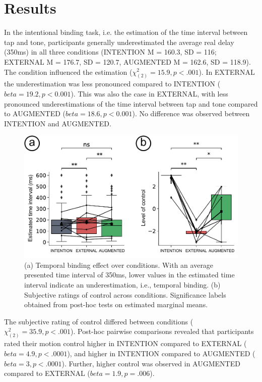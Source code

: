 \section{Results}
In the intentional binding task, i.e. the estimation of the time interval between tap and tone, participants generally underestimated the average real delay (350ms) in all three conditions (INTENTION M = 160.3, SD = 116; EXTERNAL M = 176.7, SD = 120.7, AUGMENTED M = 162.6, SD = 118.9). The condition influenced the estimation (${\chi^{2}_{(2)}} = 15.9, p < .001$). In EXTERNAL the underestimation was less pronounced compared to INTENTION ($beta = 19.2, p < 0.001$). This was also the case in EXTERNAL, with less pronounced underestimations of the time interval between tap and tone compared to AUGMENTED ($beta = 18.6, p < 0.001$). No difference was observed between INTENTION and AUGMENTED.

\begin{figure}
    \centering
    \includegraphics[width=\columnwidth]{figures/behavioral_results.pdf}
    \caption{(a) Temporal binding effect over conditions. With an average presented time interval of 350ms, lower values in the estimated time interval indicate an underestimation, i.e., temporal binding. (b) Subjective ratings of control across conditions. Significance labels obtained from post-hoc tests on estimated marginal means.}
    \label{fig:results}
\end{figure}

The subjective rating of control differed between conditions (${\chi^{2}_{(2)}} = 35.9, p < .001$). Post-hoc pairwise comparisons revealed that participants rated their motion control higher in INTENTION compared to EXTERNAL ($beta = 4.9, p < .0001$), and higher in INTENTION compared to AUGMENTED ($beta = 3, p < .0001$). Further, higher control was observed in AUGMENTED compared to EXTERNAL ($beta = 1.9, p = .006$).

